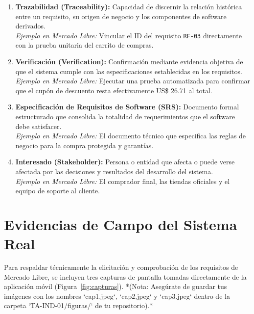 \documentclass[11pt, a4paper]{article}
\begin{document}
\begin{enumerate}
    \item \textbf{Trazabilidad (Traceability):} Capacidad de discernir la relación histórica entre un requisito, su origen de negocio y los componentes de software derivados. \\
    \textit{Ejemplo en Mercado Libre:} Vincular el ID del requisito \texttt{RF-03} directamente con la prueba unitaria del carrito de compras.
    \item \textbf{Verificación (Verification):} Confirmación mediante evidencia objetiva de que el sistema cumple con las especificaciones establecidas en los requisitos. \\
    \textit{Ejemplo en Mercado Libre:} Ejecutar una prueba automatizada para confirmar que el cupón de descuento resta efectivamente US\$ 26.71 al total.
    \item \textbf{Especificación de Requisitos de Software (SRS):} Documento formal estructurado que consolida la totalidad de requerimientos que el software debe satisfacer. \\
    \textit{Ejemplo en Mercado Libre:} El documento técnico que especifica las reglas de negocio para la compra protegida y garantías.
    \item \textbf{Interesado (Stakeholder):} Persona o entidad que afecta o puede verse afectada por las decisiones y resultados del desarrollo del sistema. \\
    \textit{Ejemplo en Mercado Libre:} El comprador final, las tiendas oficiales y el equipo de soporte al cliente.
\end{enumerate}

\section{Evidencias de Campo del Sistema Real}

Para respaldar técnicamente la elicitación y comprobación de los requisitos de Mercado Libre, se incluyen tres capturas de pantalla tomadas directamente de la aplicación móvil (Figura~\ref{fig:capturas}). *(Nota: Asegúrate de guardar tus imágenes con los nombres `cap1.jpeg`, `cap2.jpeg` y `cap3.jpeg` dentro de la carpeta `TA-IND-01/figuras/` de tu repositorio).*
\end{document}
